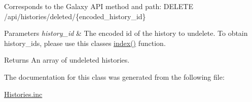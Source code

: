Corresponds to the Galaxy A\+PI method and path\+: D\+E\+L\+E\+TE /api/histories/deleted/\{encoded\+\_\+history\+\_\+id\}


\begin{DoxyParams}{Parameters}
{\em history\+\_\+id} & The encoded id of the history to undelete. To obtain history\+\_\+id\textquotesingle{}s, please use this classes\textquotesingle{} \hyperlink{classHistories_a43a92a2839e481a5f39b6444971e616f}{index()} function.\\
\hline
\end{DoxyParams}
\begin{DoxyReturn}{Returns}
An array of undeleted histories. 
\end{DoxyReturn}


The documentation for this class was generated from the following file\+:\begin{DoxyCompactItemize}
\item 
\hyperlink{Histories_8inc}{Histories.\+inc}\end{DoxyCompactItemize}
